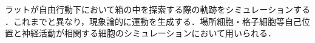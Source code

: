 ラットが自由行動下において箱の中を探索する際の軌跡をシミュレーションする \cite{Raudies2012-gp}．これまでと異なり，現象論的に運動を生成する．場所細胞・格子細胞等自己位置と神経活動が相関する細胞のシミュレーションにおいて用いられる．
